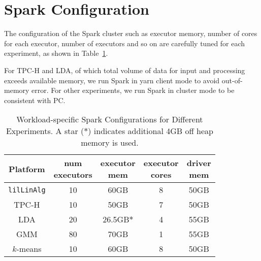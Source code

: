\section{Spark Configuration}
\label{sec:spark}

The configuration of the Spark cluster such as
executor memory, number of cores for each executor, number of
executors and so on are carefully tuned for each
experiment, as shown in Table~\ref{fig:sparkConf}.

For TPC-H and LDA, of which total volume of data for input and
processing exceeds available memory, we run Spark in yarn client
mode to avoid out-of-memory error. For other experiments, we run Spark
in cluster mode to be consistent with PC.

\begin{table}[H]
\begin{center}
\begin{tabular}{|c||c|c|c|c|}
\hline
Platform & \makecell{num\\executors} & \makecell{executor \\mem} & \makecell{executor \\cores}& \makecell{driver \\mem}\\
\hline
\texttt{lilLinAlg} &10 & 60GB & 8 & 50GB \\
TPC-H &10 & 50GB & 7 & 50GB \\
LDA &20 & 26.5GB$*$ &4 & 55GB\\
GMM&80 & 70GB & 1 & 55GB\\
$k$-means &10 &60GB & 8 & 50GB\\
\hline
\end{tabular}
\caption{Workload-specific Spark Configurations for Different
  Experiments. A star ($*$) indicates additional 4GB off heap memory is used.}
\label{fig:sparkConf}
\end{center}
\end{table}
